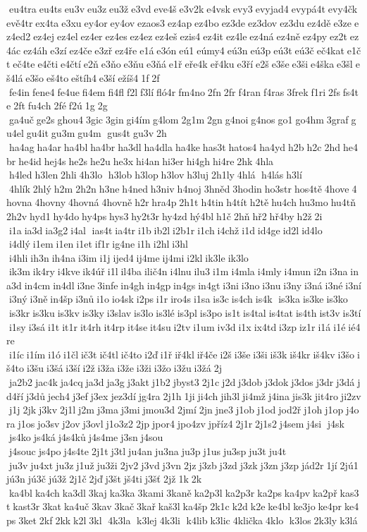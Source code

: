  eu4tra eu4ts eu3v eu3z eu3ž e3vd eve4š e3v2k e4vsk evy3 evyjad4 evypá4t evy4čk evě4tr ex4ta e3xu ey4or ey4ov ezaos3 ez4ap ez4bo ez3de ez3dov ez3du ez4dě e3ze ez4ed2 ez4ej ez4el ez4er ez4es ez4ez ez4eš ezis4 ez4it ez4le ez4ná ez4ně ez4py ez2t ez4ác ez4áh e3zí ez4če e3zř ez4ře e1á e3ón eú1 eúmy4 eú3n eú3p eú3t eú3č eč4kat e1čt eč4te e4čti e4čtí e2ň e3ňo e3ňu e3ňá e1ř eře4k eř4ku e3ří e2š e3še e3ši e4ška e3šl eš4lá e3šo eš4to eštíh4 e3ší ežíš4 1f 2f  fe4in fene4 fe4ue fi4em fi4fl f2l f3lí fló4r fm4no 2fn 2fr f4ran f4ras 3frek f1ri 2fs fs4te 2ft fu4ch 2fé f2ú 1g 2g  ga4uč ge2s ghou4 3gic 3gin gi4ím g4lom 2g1m 2gn g4noi g4nos go1 go4hm 3graf gu4el gu4it gu3m gu4m  gus4t gu3v 2h  ha4ag ha4ar ha4bl ha4br ha3dl ha4dla ha4ke has3t hatos4 ha4yd h2b h2c 2hd he4br he4id hej4s he2s he2u he3x hi4an hi3er hi4gh hi4re 2hk 4hla  h4led h3len 2hli 4h3lo  h3lob h3lop h3lov h3luj 2h1ly 4hlá  h4lás h3lí  4hlík 2hlý h2m 2h2n h3ne h4ned h3niv h4noj 3hněd 3hodin ho3str hos4tě 4hove 4hovna 4hovny 4hovná 4hovně h2r hra4p 2h1t h4tin h4tít h2tě hu4ch hu3mo hu4tň 2h2v hyd1 hy4do hy4ps hys3 hy2t3r hy4zd hý4bl h1č 2hň hř2 hř4by h2ž 2i  i1a ia3d ia3g2 i4al  ias4t ia4tr i1b ib2l i2b1r i1ch i4chž i1d id4ge id2l id4lo  i4dlý i1em i1en i1et if1r ig4ne i1h i2hl i3hl  i4hli ih3n ih4na i3im i1j ijed4 ij4me ij4mi i2kl ik3le ik3lo  ik3m ik4ry i4kve ik4úř i1l il4ba ilič4n i4lnu ilu3 i1m i4mla i4mly i4mun i2n i3na ina3d in4cm in4dl i3ne 3infe in4gh in4gp in4gs in4gt i3ni i3no i3nu i3ny i3ná i3né i3ní i3ný i3ně in4šp i3nů i1o io4sk i2ps i1r iro4s i1sa is3c is4ch is4k  is3ka is3ke is3ko  is3kr is3ku is3kv is3ky i3slav is3lo is3lé is3pl is3po is1t is4tal is4tat is4th ist3v is3tí i1sy i3sá i1t it1r it4rh it4rp it4se it4su i2tv i1um iv3d i1x ix4td i3zp iz1r i1á i1é ié4re  i1íc i1ím i1ó i1čl ič3t ič4tl ič4to i2ď i1ř iř4kl iř4če i2š i3še i3ši iš3k iš4kr iš4kv i3šo iš4to i3šu i3šá i3ší i2ž i3ža i3že i3ži i3žo i3žu i3žá 2j  ja2b2 jac4k ja4cq ja3d ja3g j3akt j1b2 jbyst3 2j1c j2d j3dob j3dok j3dos j3dr j3dá jd4ří j3dů jech4 j3ef j3ex jez3dí jg4ra 2j1h 1ji ji4ch jih3l ji4mž j4ina jis3k jit4ro ji2zv j1j 2jk j3kv 2j1l j2m j3ma j3mi jmou3d 2jmí 2jn jne3 j1ob j1od jod2ř j1oh j1op j4ora j1os jo3sv j2ov j3ovl j1o3z2 2jp jpor4 jpo4zv jpříz4 2j1r 2j1s2 j4sem j4si  j4sk  js4ko js4ká j4s4ků j4s4me j3sn j4sou  j4souc js4po j4s4te 2j1t j3tl ju4an ju3na ju3p j1us ju3sp ju3t ju4t  ju3v ju4xt ju3z j1už ju3ži 2jv2 j3vd j3vn 2jz j3zb j3zd j3zk j3zn j3zp jád2r 1jí 2jú1 jú3n jú3č jú3ž 2j1č 2jď j3št jš4ti j3šť 2jž 1k 2k  ka4bl ka4ch ka3dl 3kaj ka3ka 3kami 3kaně ka2p3l ka2p3r ka2ps ka4pv ka2př kas3t kast3r 3kat ka4uč 3kav 3kač 3kař kaš3l ka4šp 2k1c k2d k2e ke4bl ke3jo ke4pr ke4ps 3ket 2kf 2kk k2l 3kl  4k3la  k3lej 4k3li  k4lib k3lic 4klička 4klo  k3los 2k3ly k3lá 